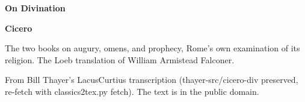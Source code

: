 \documentclass[11pt,letterpaper]{article}
\begin{document}
\color{ink}

\begin{titlepage}
\centering
\vspace*{4em}
{\LARGE\bfseries\color{heading} On Divination\par}
\vspace{2em}
{\Large\bfseries\color{heading} Cicero\par}
\vspace{2.5em}
{\itshape\color{subhead}\parbox{0.8\linewidth}{\centering The two books on augury, omens, and prophecy, Rome's own examination of its religion. The Loeb translation of William Armistead Falconer.\par}}
\vfill
{\small From Bill Thayer's LacusCurtius transcription (thayer-src/cicero-div preserved, re-fetch with classics2tex.py fetch). The text is in the public domain.\par}
\vspace{2em}
\end{titlepage}

\tableofcontents


\end{document}
